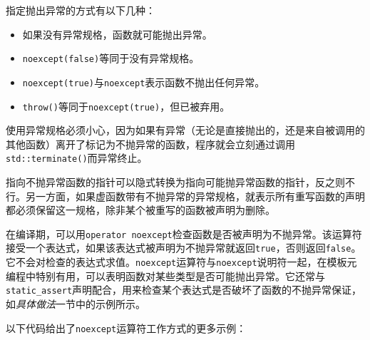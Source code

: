 
指定抛出异常的方式有以下几种：



\begin{itemize}
\item 如果没有异常规格，函数就可能抛出异常。



\item \texttt{noexcept(\allowbreak{}false)}等同于没有异常规格。



\item \texttt{noexcept(\allowbreak{}true)}与\texttt{noexcept}表示函数不抛出任何异常。



\item \texttt{throw()}等同于\texttt{noexcept(\allowbreak{}true)}，但已被弃用。

\end{itemize}



\begin{myNote}
使用异常规格必须小心，因为如果有异常（无论是直接抛出的，还是来自被调用的其他函数）离开了标记为不抛异常的函数，程序就会立刻通过调用\texttt{std::\allowbreak{}terminate()}而异常终止。
\end{myNote}



指向不抛异常函数的指针可以隐式转换为指向可能抛异常函数的指针，反之则不行。另一方面，如果虚函数带有不抛异常的异常规格，就表示所有重写函数的声明都必须保留这一规格，除非某个被重写的函数被声明为删除。



在编译期，可以用\texttt{operator noexcept}检查函数是否被声明为不抛异常。该运算符接受一个表达式，如果该表达式被声明为不抛异常就返回\texttt{true}，否则返回\texttt{false}。它不会对检查的表达式求值。\texttt{noexcept}运算符与\texttt{noexcept}说明符一起，在模板元编程中特别有用，可以表明函数对某些类型是否可能抛出异常。它还常与\texttt{static\_\allowbreak{}assert}声明配合，用来检查某个表达式是否破坏了函数的不抛异常保证，如\textit{具体做法}一节中的示例所示。



以下代码给出了\texttt{noexcept}运算符工作方式的更多示例：



